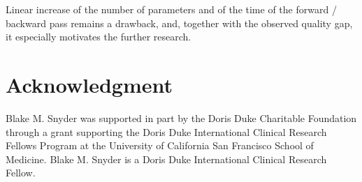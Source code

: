 \documentclass{llncs}
\begin{document}
Linear increase of the number of parameters and of the time of the forward / backward pass remains a drawback, and, together with the observed quality gap, it especially motivates the further research. %




\section*{Acknowledgment}




Blake M. Snyder was supported in part by the Doris Duke Charitable Foundation through a grant supporting the Doris Duke International Clinical Research Fellows Program at the University of California San Francisco School of Medicine.  Blake M. Snyder is a Doris Duke International Clinical Research Fellow. 




\end{document}
